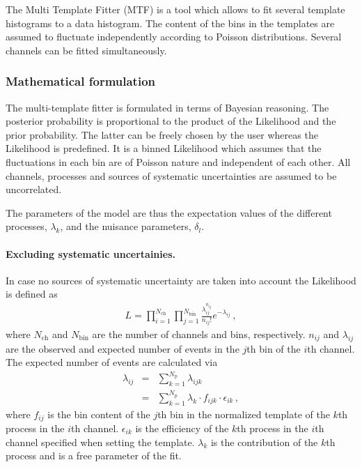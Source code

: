 \documentclass[11pt, a4paper]{article}
\begin{document}
The Multi Template Fitter (MTF) is a tool which allows to fit several
template histograms to a data histogram. The content of the bins in
the templates are assumed to fluctuate independently according to
Poisson distributions. Several channels can be fitted simultaneously.

\subsubsection{Mathematical formulation}
\label{section:math}

The multi-template fitter is formulated in terms of Bayesian reasoning. The
posterior probability is proportional to the product of the Likelihood
and the prior probability. The latter can be freely chosen by the user
whereas the Likelihood is predefined. It is a binned Likelihood which
assumes that the fluctuations in each bin are of Poisson nature and
independent of each other. All channels, processes and sources of
systematic uncertainties are assumed to be uncorrelated.

The parameters of the model are thus the expectation values of the
different processes, $\lambda_{k}$, and the nuisance parameters,
$\delta_{l}$.

\paragraph{Excluding systematic uncertainies.}
In case no sources of systematic uncertainty are taken into account
the Likelihood is defined as
%
\begin{eqnarray}
L = \prod_{i=1}^{N_{\mathrm{ch}}} \prod_{j=1}^{N_{\mathrm{bin}}} \frac{\lambda_{ij}^{n_{ij}}}{n_{ij}!} e^{-\lambda_{ij}} \, ,
\label{eqn:likelihood}
\end{eqnarray}
%
where $N_{\mathrm{ch}}$ and $N_{\mathrm{bin}}$ are the number of
channels and bins, respectively. $n_{ij}$ and $\lambda_{ij}$ are the
observed and expected number of events in the $j$th bin of the $i$th
channel. The expected number of events are calculated via
%
\begin{eqnarray}
\lambda_{ij} & = & \sum_{k=1}^{N_{\mathrm{p}}} \lambda_{ijk} \\
            & = & \sum_{k=1}^{N_{\mathrm{p}}} \lambda_{k} \cdot f_{ijk} \cdot \epsilon_{ik} \, ,
\label{eqn:expectation}
\end{eqnarray}
%
where $f_{ij}$ is the bin content of the $j$th bin in the normalized
template of the $k$th process in the $i$th channel. $\epsilon_{ik}$ is
the efficiency of the $k$th process in the $i$th channel specified
when setting the template. $\lambda_{k}$ is the contribution of the
$k$th process and is a free parameter of the fit.
\end{document}
